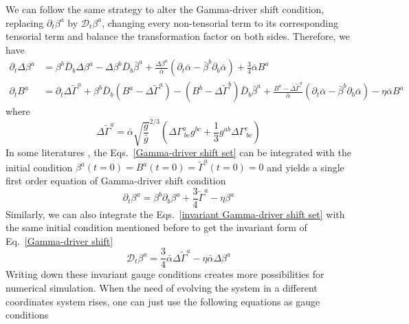 \documentclass[letterpaper,nofootinbib,prd,amsmath,onecolumn]{revtex4-1}
\begin{document}
We can follow the same strategy to alter the Gamma-driver shift condition, replacing $\partial_{t}\beta^{a}$ by $\mathscr{D}_{t}\beta^{a}$, changing every non-tensorial term to its corresponding tensorial term and balance the transformation factor on both sides. Therefore, we have
\begin{subequations}\label{invariant Gamma-driver shift set}
\begin{align}
\partial_{t}\Delta \beta^{a} & = \beta^{b}{\bar D}_{b}\Delta\beta^{a} - \Delta \beta^{b}{\bar D}_{b}{\bar \beta}^{a} + \frac{\Delta\beta^{a}}{{\bar \alpha}}(\partial_{t}{\bar \alpha} - {\bar \beta}^{b}\partial_{b}{\bar \alpha}) + \frac{3}{4}{\bar \alpha}B^{a}\\
\partial_{t}B^{a} & = \partial_{t}\Delta {\tilde \Gamma}^{a} + \beta^{b}{\bar D}_{b}(B^{a} - \Delta{\tilde \Gamma}^{a}) - (B^{b} - \Delta{\tilde \Gamma}^{b}){\bar D}_{b}{\bar \beta}^{a} + \frac{B^{a} - \Delta{\tilde \Gamma}^{a}}{{\bar \alpha}}(\partial_{t}{\bar \alpha} - {\bar \beta}^{b}\partial_{b}{\bar \alpha}) - \eta{\bar \alpha}B^{a}
\end{align}
\end{subequations}
where
\begin{equation}
\Delta {\tilde \Gamma}^{a} = {\bar \alpha}\sqrt{\frac{g}{{\bar g}}}^{2/3}\left(\Delta \Gamma^{a}_{~bc}g^{bc} + \frac{1}{3}g^{ab}\Delta \Gamma^{c}_{~bc}\right)
\end{equation}
In some literatures \cite{vanMeter:2006vi}, the Eqs.~\ref{Gamma-driver shift set} can be integrated with the initial condition $\beta^{a}(t=0) = B^{a}(t=0) = {\tilde \Gamma}^{a}(t = 0) = 0$ and yields a single first order equation of Gamma-driver shift condition
\begin{equation}\label{Gamma-driver shift}
\partial_{t}\beta^{a} = \beta^{b}\partial_{b}\beta^{a} + \frac{3}{4}{\tilde \Gamma}^{a} - \eta \beta^{a}
\end{equation} 
Similarly, we can also integrate the Eqs.~\ref{invariant Gamma-driver shift set} with the same initial condition mentioned before to get the invariant form of Eq.~\ref{Gamma-driver shift}
\begin{equation}\label{invariant Gamma-driver shift}
\mathscr{D}_{t}\beta^{a} = \frac{3}{4}{\bar \alpha}\Delta {\tilde \Gamma}^{a} - \eta {\bar \alpha}\Delta\beta^{a}
\end{equation}
Writing down these invariant gauge conditions creates more possibilities for numerical simulation. When the need of evolving the system in a different coordinates system rises, one can just use the following equations as gauge conditions
\end{document}
